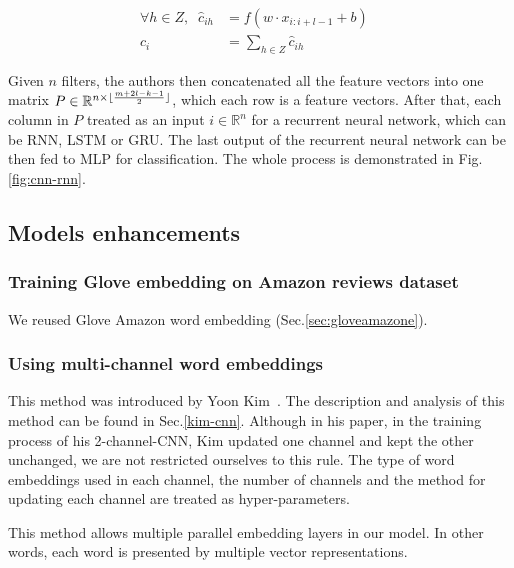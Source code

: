 \begin{align}
    \forall h \in Z, \; \; \hat{c}_{ih} &= f(w \cdot x_{i:i+l-1} + b)& \\
    c_i &= \sum_{h \in Z} \hat{c}_{ih}&
\end{align}

Given \(n\) filters, the authors then concatenated all the feature vectors into one matrix \(P \in \mathbb{R}^{n \times \lfloor \frac{m + 2l - k - 1}{2} \rfloor}\), which each row is a feature vectors.
After that, each column in \(P\) treated as an input \(i \in \mathbb{R}^{n}\) for a recurrent neural network, which can be RNN, LSTM or GRU.
The last output of the recurrent neural network can be then fed to MLP for classification.
The whole process is demonstrated in Fig.\ref{fig:cnn-rnn}.


\subsection{Models enhancements}\label{sec:model-enhan}
\subsubsection{Training Glove embedding on Amazon reviews dataset}\label{sec:reuse-glove-amazon}
We reused Glove Amazon word embedding (Sec.\ref{sec:gloveamazone}).

\subsubsection{Using multi-channel word embeddings}\label{sec:enhan-multi-channel}
This method was introduced by Yoon Kim~\cite{KimCNN}.
The description and analysis of this method can be found in Sec.\ref{kim-cnn}.
Although in his paper, in the training process of his 2-channel-CNN, Kim updated one channel and kept the other unchanged, we are not restricted ourselves to this rule.
The type of word embeddings used in each channel, the number of channels and the method for updating each channel are treated as hyper-parameters.

This method allows multiple parallel embedding layers in our model.
In other words, each word is presented by multiple vector representations.

